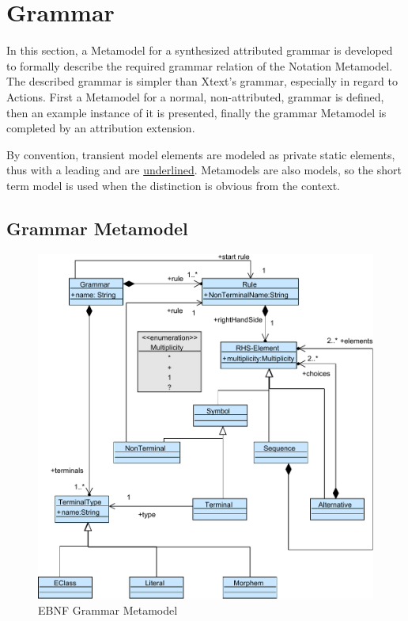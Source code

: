\section{Grammar}
In this section, a Metamodel for a synthesized attributed grammar is developed to formally describe the required grammar relation of the Notation Metamodel. The described grammar is simpler than Xtext's grammar, especially in regard to Actions. First a Metamodel for a normal, non-attributed, grammar is defined, then an example instance of it is presented, finally the grammar Metamodel is completed by an attribution extension.

By convention, transient model elements are modeled as private static elements, thus with a leading \code{-} and are \underline{underlined}. Metamodels are also models, so the short term model is used when the distinction is obvious from the context.

\subsection{Grammar Metamodel}
\begin{figure}
\centering
\includegraphics[scale=0.85]{gfx/ex/Grammar_CFG} 
\caption{EBNF Grammar Metamodel}
\label{MM:EBNF}
\end{figure}


